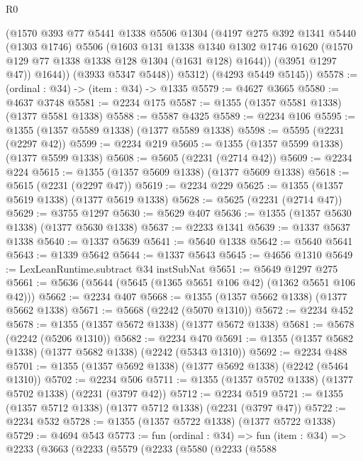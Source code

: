\begin{lexlean}{R0}
\begin{coremodule}
            (@1570
              @393
              @77
              @5441
              @1338
              @5506
              @1304
              (@4197
                @275
                @392
                @1341
                @5440
                (@1303 @1746)
                @5506
                (@1603
                  @131
                  @1338
                  @1340
                  @1302
                  @1746
                  @1620
                  (@1570 @129 @77 @1338 @1338 @128 @1304 (@1631 @128) @1644))
                (@3951 @1297 @47))
              @1644))
          (@3933 @5347 @5448))
        @5312)
      (@4293 @5449 @5145))
@5578 := (ordinal : @34) -> (item : @34) -> @1335
@5579 := @4627 @3665
@5580 := @4637 @3748
@5581 := @2234 @175
@5587 := @1355 (@1357 @5581 @1338) (@1377 @5581 @1338)
@5588 := @5587 @4325
@5589 := @2234 @106
@5595 := @1355 (@1357 @5589 @1338) (@1377 @5589 @1338)
@5598 := @5595 (@2231 (@2297 @42))
@5599 := @2234 @219
@5605 := @1355 (@1357 @5599 @1338) (@1377 @5599 @1338)
@5608 := @5605 (@2231 (@2714 @42))
@5609 := @2234 @224
@5615 := @1355 (@1357 @5609 @1338) (@1377 @5609 @1338)
@5618 := @5615 (@2231 (@2297 @47))
@5619 := @2234 @229
@5625 := @1355 (@1357 @5619 @1338) (@1377 @5619 @1338)
@5628 := @5625 (@2231 (@2714 @47))
@5629 := @3755 @1297
@5630 := @5629 @407
@5636 := @1355 (@1357 @5630 @1338) (@1377 @5630 @1338)
@5637 := @2233 @1341
@5639 := @1337 @5637 @1338
@5640 := @1337 @5639
@5641 := @5640 @1338
@5642 := @5640 @5641
@5643 := @1339 @5642
@5644 := @1337 @5643
@5645 := @4656 @1310
@5649 := LexLeanRuntime.subtract @34 instSubNat
@5651 := @5649 @1297 @275
@5661 := @5636 (@5644 (@5645 (@1365 @5651 @106 @42) (@1362 @5651 @106 @42)))
@5662 := @2234 @407
@5668 := @1355 (@1357 @5662 @1338) (@1377 @5662 @1338)
@5671 := @5668 (@2242 (@5070 @1310))
@5672 := @2234 @452
@5678 := @1355 (@1357 @5672 @1338) (@1377 @5672 @1338)
@5681 := @5678 (@2242 (@5206 @1310))
@5682 := @2234 @470
@5691 := @1355 (@1357 @5682 @1338) (@1377 @5682 @1338) (@2242 (@5343 @1310))
@5692 := @2234 @488
@5701 := @1355 (@1357 @5692 @1338) (@1377 @5692 @1338) (@2242 (@5464 @1310))
@5702 := @2234 @506
@5711 := @1355 (@1357 @5702 @1338) (@1377 @5702 @1338) (@2231 (@3797 @42))
@5712 := @2234 @519
@5721 := @1355 (@1357 @5712 @1338) (@1377 @5712 @1338) (@2231 (@3797 @47))
@5722 := @2234 @532
@5728 := @1355 (@1357 @5722 @1338) (@1377 @5722 @1338)
@5729 := @4694 @543
@5773 := fun (ordinal : @34) =>
  fun (item : @34) =>
  @2233
    (@3663
      (@2233
        (@5579
          (@2233
            (@5580
              (@2233
                (@5588

\end{coremodule}
\end{lexlean}
